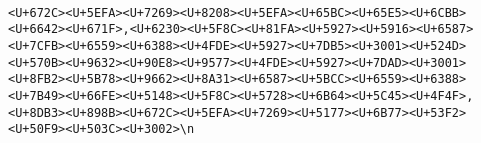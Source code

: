 \documentclass[
]{article}
\begin{document}
\begin{verbatim}
                                                                                                                                                                                                                                                                                                                                                                                                                                                                                                                                                                                                                                                                                                                                                                                                                                                                                                                                                                                  <U+672C><U+5EFA><U+7269><U+8208><U+5EFA><U+65BC><U+65E5><U+6CBB><U+6642><U+671F>,<U+6230><U+5F8C><U+81FA><U+5927><U+5916><U+6587><U+7CFB><U+6559><U+6388><U+4FDE><U+5927><U+7DB5><U+3001><U+524D><U+570B><U+9632><U+90E8><U+9577><U+4FDE><U+5927><U+7DAD><U+3001><U+8FB2><U+5B78><U+9662><U+8A31><U+6587><U+5BCC><U+6559><U+6388><U+7B49><U+66FE><U+5148><U+5F8C><U+5728><U+6B64><U+5C45><U+4F4F>,<U+8DB3><U+898B><U+672C><U+5EFA><U+7269><U+5177><U+6B77><U+53F2><U+50F9><U+503C><U+3002>\n

\end{verbatim}
\end{document}
